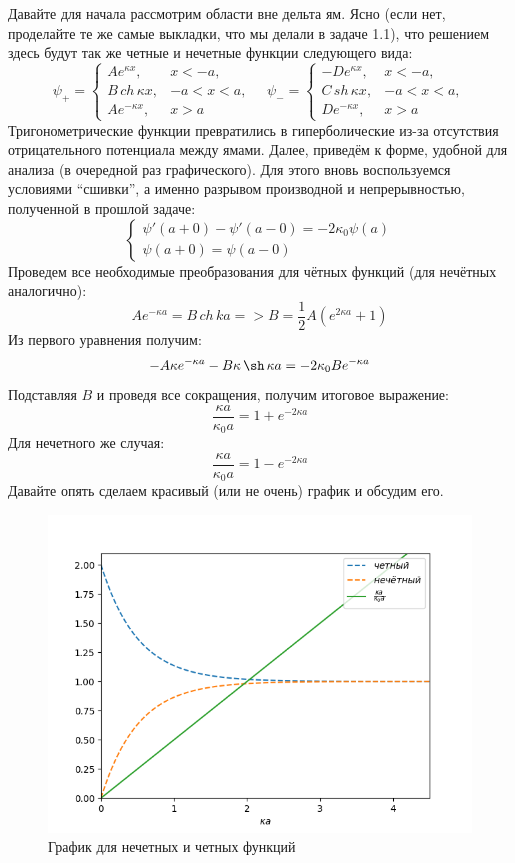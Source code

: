Давайте для начала рассмотрим области вне дельта ям. Ясно (если нет, проделайте те же самые выкладки, что мы делали в задаче 1.1), что решением здесь будут так же четные и нечетные функции следующего вида:
\[
\psi_+ =
\begin{cases}
    Ae^{\kappa x}, & x < -a,\\
    B\,ch\,\kappa x, & -a < x < a,\\
    Ae^{-\kappa x},& x > a
\end{cases}\quad
\psi_- =
\begin{cases}
    -De^{\kappa x},& x < -a,\\
    C\, sh\, \kappa x, & -a < x < a,\\
    De^{-\kappa x},& x > a
\end{cases}
\]
Тригонометрические функции превратились в гиперболические из-за отсутствия отрицательного потенциала между ямами. Далее, приведём к форме, удобной для анализа (в очередной раз графического). Для этого вновь воспользуемся условиями ``сшивки'', а именно разрывом производной и непрерывностью, полученной в прошлой задаче:
\[
\begin{cases}
\psi'(a+0) - \psi'(a-0) = -2\kappa_0\psi(a)\\
\psi(a+0) = \psi(a-0)    
\end{cases}
\]
Проведем все необходимые преобразования для чётных функций (для нечётных аналогично):
\[
Ae^{-\kappa a} = B\,ch\,ka => B = \frac{1}{2}A(e^{2\kappa a} + 1)
\]
Из первого уравнения получим:
\[
-A\kappa e^{-\kappa a} - B\kappa\,\sh\,\kappa a = -2\kappa_0 Be^{-\kappa a}
\]
Подставляя $B$ и проведя все сокращения, получим итоговое выражение:
\begin{equation}
    \frac{\kappa a}{\kappa_0 a} = 1 + e^{-2\kappa a}
\end{equation}
Для нечетного же случая:
\begin{equation}
    \frac{\kappa a}{\kappa_0 a} = 1 - e^{-2\kappa a}
\end{equation}
Давайте опять сделаем красивый (или не очень) график и обсудим его.
\begin{figure}[!ht]
\centering
\includegraphics[scale=0.7]{class_4/images/delta.png}
\caption{График для нечетных и четных функций}
\label{fig 4.4}
\end{figure}


